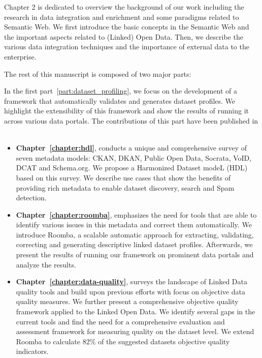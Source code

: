 Chapter 2 is dedicated to overview the background of our work including the research in data integration and enrichment and some paradigms related to Semantic Web. We first introduce the basic concepts in the Semantic Web and the important aspects related to (Linked) Open Data. Then, we describe the various data integration techniques and the importance of external data to the enterprise.

The rest of this manuscript is composed of two major parts:

In the first part~\ref{part:dataset_profiling}, we focus on the development of a framework that automatically validates and generates dataset profiles. We highlight the extensibility of this framework and show the results of running it across various data portals. The contributions of this part have been published in ~\cite{Assaf:WWW:15,Assaf:IJSWIS:15,Assaf:PROFILES:15,Assaf:ESWC:PROFILES:15,Assaf:ESWC:LDQ:15}

\begin{itemize}
	\item \textbf{Chapter~\ref{chapter:hdl}}, conducts a unique and comprehensive survey of seven metadata models: CKAN, DKAN, Public Open Data, Socrata, VoID, DCAT and Schema.org. We propose a Harmonized Dataset modeL (HDL) based on this survey. We describe use cases that show the benefits of providing rich metadata to enable dataset discovery, search and Spam detection.
	\item \textbf{Chapter~\ref{chapter:roomba}}, emphasizes the need for tools that are able to identify various issues in this metadata and correct them automatically. We introduce Roomba, a scalable automatic approach for extracting, validating, correcting and generating descriptive linked dataset profiles. Afterwards, we present the results of running our framework on prominent data portals and analyze the results.
	\item \textbf{Chapter~\ref{chapter:data-quality}}, surveys the landscape of Linked Data quality tools and build upon previous efforts with focus on objective data quality measures. We further present a comprehensive objective quality framework applied to the Linked Open Data. We identify several gaps in the current tools and find the need for a comprehensive evaluation and assessment framework for measuring quality on the dataset level. We extend Roomba to calculate 82\% of the suggested datasets objective quality indicators.
\end{itemize}